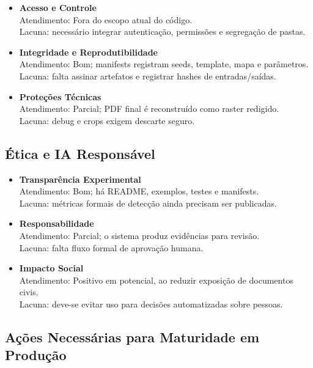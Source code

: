 \documentclass[12pt,a4paper]{article}
\begin{document}
\begin{itemize}
    \item \textbf{Acesso e Controle} \\
    Atendimento: Fora do escopo atual do código. \\
    Lacuna: necessário integrar autenticação, permissões e segregação de pastas.

    \item \textbf{Integridade e Reprodutibilidade} \\
    Atendimento: Bom; manifests registram seeds, template, mapa e parâmetros. \\
    Lacuna: falta assinar artefatos e registrar hashes de entradas/saídas.

    \item \textbf{Proteções Técnicas} \\
    Atendimento: Parcial; PDF final é reconstruído como raster redigido. \\
    Lacuna: debug e crops exigem descarte seguro.
\end{itemize}

\subsection{Ética e IA Responsável}

\begin{itemize}
    \item \textbf{Transparência Experimental} \\
    Atendimento: Bom; há README, exemplos, testes e manifests. \\
    Lacuna: métricas formais de detecção ainda precisam ser publicadas.

    \item \textbf{Responsabilidade} \\
    Atendimento: Parcial; o sistema produz evidências para revisão. \\
    Lacuna: falta fluxo formal de aprovação humana.

    \item \textbf{Impacto Social} \\
    Atendimento: Positivo em potencial, ao reduzir exposição de documentos civis. \\
    Lacuna: deve-se evitar uso para decisões automatizadas sobre pessoas.
\end{itemize}

\subsection{Ações Necessárias para Maturidade em Produção}
\end{document}
